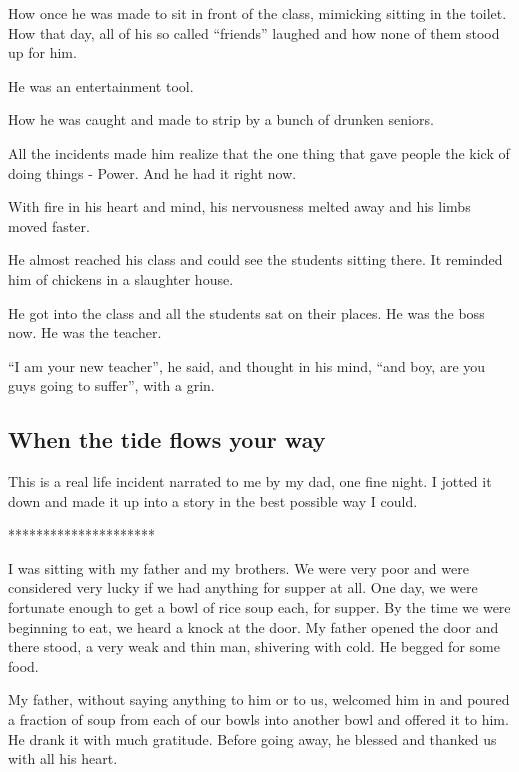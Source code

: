 \documentclass[twoside,11pt,titlepage]{article}
\begin{document}
How once he was made to sit in front of the class, mimicking sitting in the toilet. How that day, all of his so called ``friends'' laughed and how none of them stood up for him.

He was an entertainment tool.

How he was caught and made to strip by a bunch of drunken seniors.

All the incidents made him realize that the one thing that gave people the kick of doing things - Power. And he had it right now.

With fire in his heart and mind, his nervousness melted away and his limbs moved faster.

He almost reached his class and could see the students sitting there. It reminded him of chickens in a slaughter house.

He got into the class and all the students sat on their places. He was the boss now. He was the teacher.

``I am your new teacher'', he said, and thought in his mind, ``and boy, are you guys going to suffer'', with a grin.

\newpage
\begin{center}
  \section{When the tide flows your way}
\end{center}
\bigskip
\bigskip
\bigskip

This is a real life incident narrated to me by my dad, one fine night. I jotted it down and made it up into a story in the best possible way I could.

\bigskip
\begin{center}
*********************
\end{center}

I was sitting with my father and my brothers. We were very poor and were considered very lucky if we had anything for supper at all. One day, we were fortunate enough to get a bowl of rice soup each, for supper. By the time we were beginning to eat, we heard a knock at the door. My father opened the door and there stood, a very weak and thin man, shivering with cold. He begged for some food.

My father, without saying anything to him or to us, welcomed him in and poured a fraction of soup from each of our bowls into another bowl and offered it to him. He drank it with much gratitude. Before going away, he blessed and thanked us with all his heart.
\end{document}
